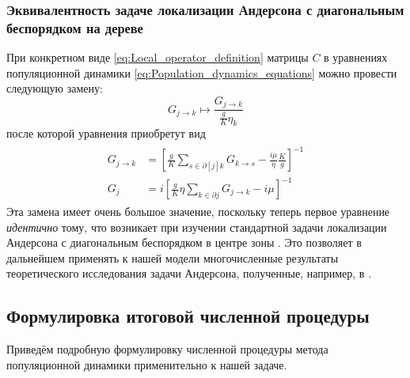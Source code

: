 \subsubsection{Эквивалентность задаче локализации Андерсона с диагональным беспорядком на дереве}
При конкретном виде \eqref{eq:Local_operator_definition} матрицы $C$ в уравнениях популяционной динамики \eqref{eq:Population_dynamics_equations} можно провести следующую замену:
\begin{equation}
\label{eq:Population_dynamics_change_of_variables}
G_{j \rightarrow k} \longmapsto \frac{ G_{j \rightarrow k} }{ \frac{g}{K} \eta_k}
\end{equation}
после которой уравнения приобретут вид
\begin{equation}
\label{eq:Population_dynamics_final_equations}
\begin{split}
\begin{split}
G_{j \rightarrow k} & = \left[ \frac{g}{K} \sum_{s \in \partial[j]k} G_{k \rightarrow s} - \frac{  i \mu}{\eta} \frac{K}{g} \right]^{-1} \\
G_j & = i \left[ \frac{g}{K} \eta \sum_{k \in \partial j} G_{j \rightarrow k} - i\mu \right]^{-1}
\end{split}
\end{split}
\end{equation}
Эта замена имеет очень большое значение, поскольку теперь первое уравнение \textit{идентично} тому, что возникает при изучении стандартной задачи локализации Андерсона с диагональным беспорядком в центре зоны \cite{Biroli_2010}. Это позволяет в дальнейшем применять к нашей модели многочисленные результаты теоретического исследования задачи Андерсона, полученные, например, в \cite{AAT}.


\subsection{Формулировка итоговой численной процедуры}
Приведём подробную формулировку численной процедуры метода популяционной динамики применительно к нашей задаче.


